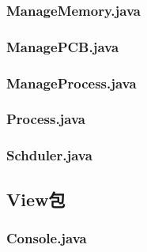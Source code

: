 \documentclass[UTF8,12pt]{article}
\begin{document}
\subsubsection{ManageMemory.java}
\subsubsection{ManagePCB.java}
\subsubsection{ManageProcess.java}
\subsubsection{Process.java}
\subsubsection{Schduler.java}

\subsection{View包}
\subsubsection{Console.java}
\end{document}
